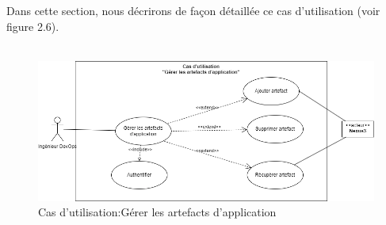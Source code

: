          Dans cette section, nous décrirons de façon détaillée ce cas d'utilisation (voir figure 2.6).\\\texttt{}\\[0.01cm]
         
         \begin{figure}[H]
          \begin{center}
          
              \includegraphics[width=15cm]{Usecase6.drawio.png}
        
          \end{center}
          
          \caption{Cas d'utilisation:Gérer les artefacts d'application}
        \end{figure}
         
